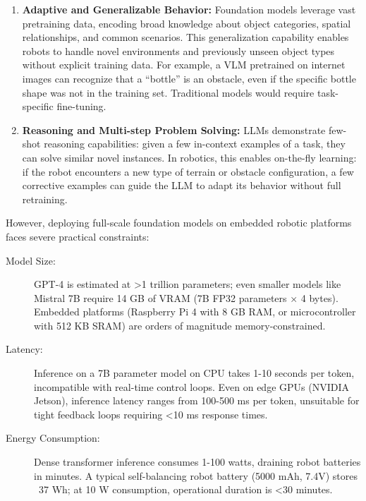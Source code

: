 \begin{enumerate}
    
\item \textbf{Adaptive and Generalizable Behavior:} Foundation models leverage vast pretraining data, encoding 
broad knowledge about object categories, spatial relationships, and common scenarios. This generalization capability 
enables robots to handle novel environments and previously unseen object types without explicit training data. For 
example, a VLM pretrained on internet images can recognize that a ``bottle'' is an obstacle, even if the specific 
bottle shape was not in the training set. Traditional models would require task-specific fine-tuning.

    
\item \textbf{Reasoning and Multi-step Problem Solving:} LLMs demonstrate few-shot reasoning capabilities: given 
a few in-context examples of a task, they can solve similar novel instances. In robotics, this enables on-the-fly 
learning: if the robot encounters a new type of terrain or obstacle configuration, a few corrective examples can 
guide the LLM to adapt its behavior without full retraining.

\end{enumerate}

However, deploying full-scale foundation models on embedded robotic platforms faces severe practical constraints:

\begin{description}
    \item[Model Size:] GPT-4 is estimated at >1 trillion parameters; even smaller models like Mistral 7B require 
    14 GB of VRAM (7B FP32 parameters × 4 bytes). Embedded platforms (Raspberry Pi 4 with 8 GB RAM, or microcontroller 
    with 512 KB SRAM) are orders of magnitude memory-constrained.
    
    \item[Latency:] Inference on a 7B parameter model on CPU takes 1-10 seconds per token, incompatible with 
    real-time control loops. Even on edge GPUs (NVIDIA Jetson), inference latency ranges from 100-500 ms per token, 
    unsuitable for tight feedback loops requiring <10 ms response times.
    
    \item[Energy Consumption:] Dense transformer inference consumes 1-100 watts, draining robot batteries in minutes. 
    A typical self-balancing robot battery (5000 mAh, 7.4V) stores ~37 Wh; at 10 W consumption, operational duration 
    is <30 minutes.
\end{description}


